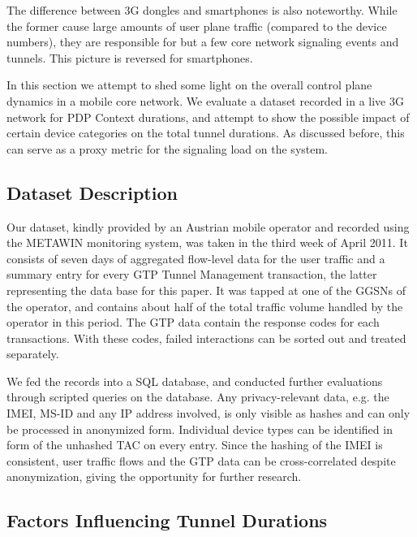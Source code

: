 The difference between 3G dongles and smartphones is also noteworthy. While the former cause large amounts of user plane traffic (compared to the device numbers), they are responsible for but a few core network signaling events and tunnels. This picture is reversed for smartphones.




In this section we attempt to shed some light on the overall control plane dynamics in a mobile core network. We evaluate a dataset recorded in a live 3G network for PDP Context durations, and attempt to show the possible impact of certain device categories on the total tunnel durations. As discussed before, this can serve as a proxy metric for the signaling load on the system. 


\subsection{Dataset Description}
Our dataset, kindly provided by an Austrian mobile operator and recorded using the \ac{METAWIN} monitoring system, was taken in the third week of April 2011. It consists of seven days of aggregated flow-level data for the user traffic and a summary entry for every \ac{GTP} Tunnel Management transaction, the latter representing the data base for this paper. It was tapped at one of the \acp{GGSN} of the operator, and contains about half of the total traffic volume handled by the operator in this period. The \ac{GTP} data contain the response codes for each transactions. With these codes, failed interactions can be sorted out and treated separately.

We fed the records into a SQL database, and conducted further evaluations through scripted queries on the database. Any privacy-relevant data, e.g. the \ac{IMEI}, \ac{MS-ID} and any IP address involved, is only visible as hashes and can only be processed in anonymized form. Individual device types can be identified in form of the unhashed \ac{TAC} on every entry. Since the hashing of the \ac{IMEI} is consistent, user traffic flows and the \ac{GTP} data can be cross-correlated despite anonymization, giving the opportunity for further research.

 

\subsection{Factors Influencing Tunnel Durations}


